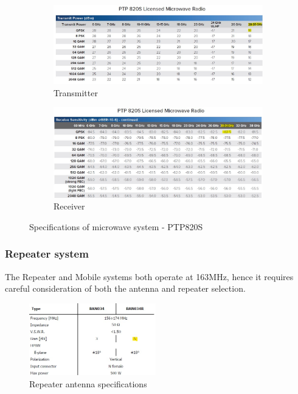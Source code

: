\begin{figure}[H]
\centering
     \begin{subfigure}[b]{0.45\textwidth}
         \centering
         \includegraphics[width=\textwidth]{Images/PTP 820S TX.jpg}
         \caption{\small Transmitter}
         \label{fig:PTPTx}
     \end{subfigure}
     \hspace{1cm}
     \begin{subfigure}[b]{0.45\textwidth}
         \centering
         \includegraphics[width=\textwidth]{Images/PTP 820S RX.jpg}
         \caption{\small Receiver}
         \label{fig:PTPRx}
     \end{subfigure}
     \caption{Specifications of microwave system - PTP820S}
        \label{fig:PTP820S}
\end{figure}

\subsubsection{Repeater system}
The Repeater and Mobile systems both operate at 163MHz, hence it requires careful consideration of both the antenna and repeater selection.

\begin{figure}
    \centering
    \includegraphics[width=0.49\textwidth]{Images/BAN034R - Repeater.jpg}
    \caption{\small Repeater antenna specifications}
    \label{fig:RP_Ant}
\end{figure}

